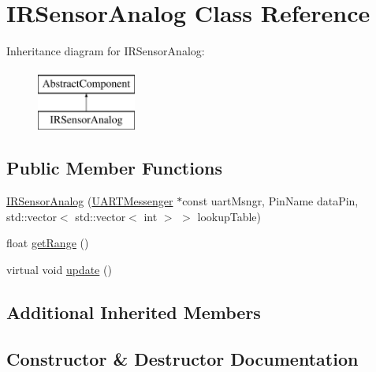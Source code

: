 \hypertarget{class_i_r_sensor_analog}{}\section{I\+R\+Sensor\+Analog Class Reference}
\label{class_i_r_sensor_analog}
Inheritance diagram for I\+R\+Sensor\+Analog\+:\begin{figure}[H]
\begin{center}
\leavevmode
\includegraphics[height=2.000000cm]{class_i_r_sensor_analog}
\end{center}
\end{figure}
\subsection*{Public Member Functions}
\begin{DoxyCompactItemize}
\item 
\hyperlink{class_i_r_sensor_analog_af27166832035783b3df081014c4dfb9d}{I\+R\+Sensor\+Analog} (\hyperlink{class_u_a_r_t_messenger}{U\+A\+R\+T\+Messenger} $\ast$const uart\+Msngr, Pin\+Name data\+Pin, std\+::vector$<$ std\+::vector$<$ int $>$ $>$ lookup\+Table)
\item 
float \hyperlink{class_i_r_sensor_analog_aa6642b85ec1018980e216eab0dfd27f2}{get\+Range} ()
\item 
virtual void \hyperlink{class_i_r_sensor_analog_a919942de7c5fc3af5da9a2b32e31d328}{update} ()
\end{DoxyCompactItemize}
\subsection*{Additional Inherited Members}


\subsection{Constructor \& Destructor Documentation}
\mbox{\label{class_i_r_sensor_analog_af27166832035783b3df081014c4dfb9d}} 
